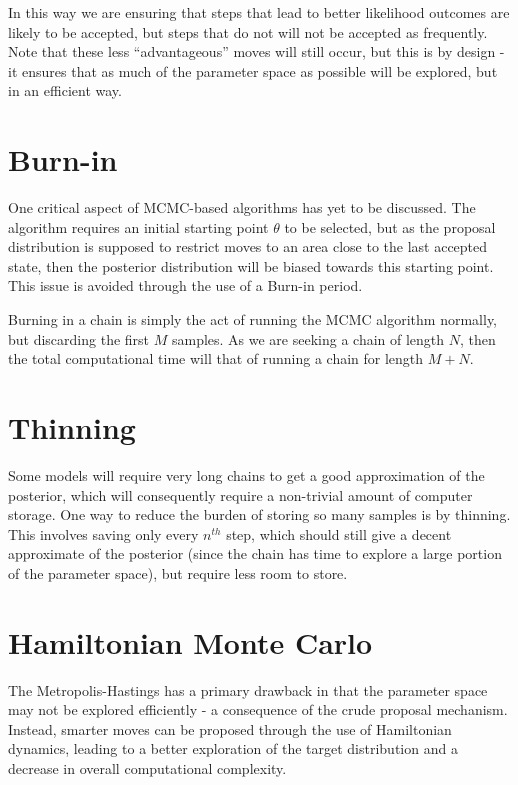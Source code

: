 \documentclass[12pt]{article}
\begin{document}
    In this way we are ensuring that steps that lead to better likelihood outcomes are likely to be accepted, but steps that do not will not be accepted as frequently. Note that these less ``advantageous'' moves will still occur, but this is by design - it ensures that as much of the parameter space as possible will be explored, but in an efficient way.

\section{Burn-in}

    One critical aspect of MCMC-based algorithms has yet to be discussed. The algorithm requires an initial starting point $\theta$ to be selected, but as the proposal distribution is supposed to restrict moves to an area close to the last accepted state, then the posterior distribution will be biased towards this starting point. This issue is avoided through the use of a Burn-in period.

    Burning in a chain is simply the act of running the MCMC algorithm normally, but discarding the first $M$ samples. As we are seeking a chain of length $N$, then the total computational time will that of running a chain for length $M+N$.

\section{Thinning}

    Some models will require very long chains to get a good approximation of the posterior, which will consequently require a non-trivial amount of computer storage. One way to reduce the burden of storing so many samples is by thinning. This involves saving only every $n^{th}$ step, which should still give a decent approximate of the posterior (since the chain has time to explore a large portion of the parameter space), but require less room to store.

\section{Hamiltonian Monte Carlo}

    The Metropolis-Hastings has a primary drawback in that the parameter space may not be explored efficiently - a consequence of the crude proposal mechanism. Instead, smarter moves can be proposed through the use of Hamiltonian dynamics, leading to a better exploration of the target distribution and a decrease in overall computational complexity.
\end{document}
